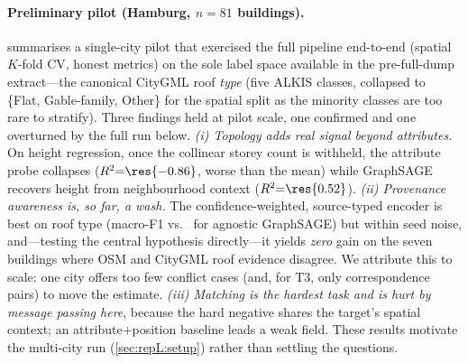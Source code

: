 \paragraph{Preliminary pilot (Hamburg, $n{=}81$ buildings).}
 summarises a single-city pilot that exercised the full
pipeline end-to-end (spatial $K$-fold CV, honest metrics) on the sole label
space available in the pre-full-dump extract---the canonical CityGML roof
\emph{type} (five ALKIS classes, collapsed to \{Flat, Gable-family, Other\} for
the spatial split as the minority classes are too rare to stratify). Three
findings held at pilot scale, one confirmed and one overturned by the full run
below.
\emph{(i) Topology adds real signal beyond attributes.} On height regression,
once the collinear storey count is withheld, the attribute probe collapses
($R^2{=}\res{-0.86}$, worse than the mean) while GraphSAGE recovers height from
neighbourhood context ($R^2{=}\res{0.52}$). \emph{(ii) Provenance awareness is,
so far, a wash.} The confidence-weighted, source-typed encoder is best on roof
type (macro-F1  vs.\  for agnostic GraphSAGE) but within
seed noise, and---testing the central hypothesis directly---it yields
\emph{zero} gain on the seven buildings where OSM and CityGML roof evidence
disagree. We attribute this to scale: one city offers too few conflict cases
(and, for T3, only  correspondence pairs) to move the estimate. \emph{(iii)
Matching is the hardest task and is hurt by message passing here}, because the
hard negative shares the target's spatial context; an attribute$+$position
baseline leads a weak field. These results motivate the multi-city run
(\cref{sec:repL:setup}) rather than settling the questions.

